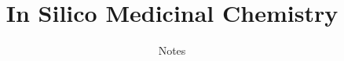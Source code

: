 \title{In Silico Medicinal Chemistry}
\author{Notes}
\date{}


\maketitle
\thispagestyle{empty}
\clearpage
